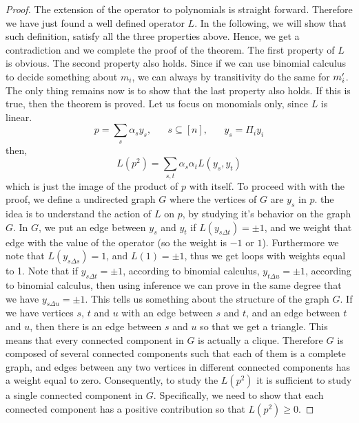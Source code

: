 \documentclass[a4paper,twoside,justified]{tufte-handout}
\begin{document}
\begin{proof}
The extension of the operator to polynomials is straight forward. Therefore we have just found a well defined operator $L$. In the following, we will show that such definition, satisfy all the three properties above. Hence, we get a contradiction and we complete the proof of the theorem. The first  property of $L$ is obvious. The second property also holds. Since if we can use binomial calculus to decide something about $m_i$, we can always by transitivity do the same for $m_i\rq{}$. The only thing remains now is to show that the last property also holds. If this is true, then the theorem is proved.
Let us focus on monomials only, since $L$ is linear. 
\begin{equation*}
p = \sum_s \alpha_s y_s, \;\;\;\;\;\; s \subseteq [n], \;\;\;\;\;\; y_s = \Pi_i y_i
\end{equation*}
then,
\begin{equation*}
L(p^2) =  \sum_{s,t} \alpha_s \alpha_t L( y_s, y_t)
\end{equation*}
which is just the image of the product of $p$ with itself. To proceed with with the proof, we define a undirected graph $G$ where the vertices of $G$ are ${y_s}$ in $p$. the idea is to understand the action of $L$ on $p$, by studying it\rq{}s behavior on the graph $G$. In $G$, we put an edge between $y_s$ and $y_t$ if $L(y_{s\Delta t}) = \pm 1$, and we weight that edge with the value of the operator (so the weight is $-1$ or $1$).  Furthermore we note that $L(y_{s\Delta s}) =  1$, and $L(1) = \pm 1$, thus we get loops with weights equal to 1. Note that if $y_{s\Delta t} = \pm1$, according to binomial calculus, $y_{t\Delta u} = \pm1$, according to binomial calculus, then using inference we can prove in the same degree that we have $y_{s\Delta u} = \pm1$. This tells us something about the structure of the graph $G$. If we have vertices $s$, $t$ and $u$ with an edge between $s$ and $t$, and an edge between $t$ and $u$, then there is an edge between $s$ and $u$ so that we get a triangle. This means that every connected component in $G$ is actually a clique. Therefore $G$ is composed of several connected components such that each of them is a complete graph, and edges between any two vertices in different connected components has a weight equal to zero. Consequently, to study the $L(p^2)$ it is sufficient to study a single connected component in $G$. Specifically, we need to show that each connected component has a positive contribution so that $L(p^2) \geq 0$.


\end{proof}
\end{document}
